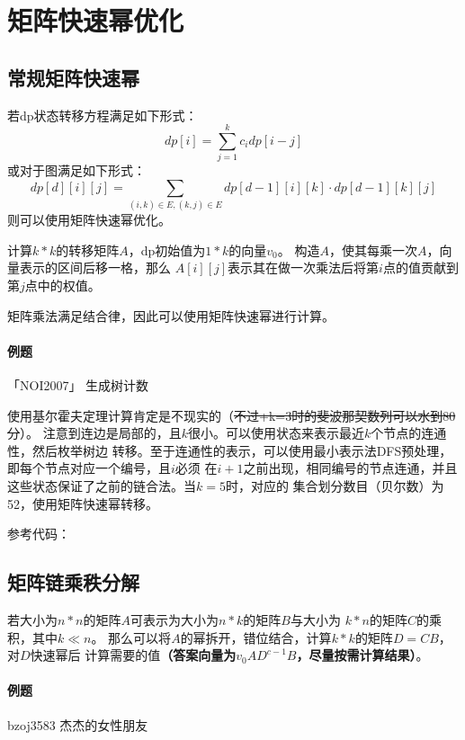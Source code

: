 \section{矩阵快速幂优化}
\subsection{常规矩阵快速幂}
若dp状态转移方程满足如下形式：
\begin{displaymath}
    dp[i]=\sum_{j=1}^k{c_idp[i-j]}
\end{displaymath}
或对于图满足如下形式：
\begin{displaymath}
    dp[d][i][j]=\sum_{(i,k)\in E,(k,j)\in E}{dp[d-1][i][k]\cdot dp[d-1][k][j]}
\end{displaymath}
则可以使用矩阵快速幂优化。

计算$k*k$的转移矩阵$A$，dp初始值为$1*k$的向量$v_0$。
构造$A$，使其每乘一次$A$，向量表示的区间后移一格，那么
$A[i][j]$表示其在做一次乘法后将第$i$点的值贡献到第$j$点中的权值。

矩阵乘法满足结合律，因此可以使用矩阵快速幂进行计算。

\paragraph{例题} 「NOI2007」 生成树计数

使用基尔霍夫定理计算肯定是不现实的（\sout{不过+k=3时的斐波那契数列可以水到80分}）。
注意到连边是局部的，且$k$很小。可以使用状态来表示最近$k$个节点的连通性，然后枚举树边
转移。至于连通性的表示，可以使用最小表示法DFS预处理，即每个节点对应一个编号，且$i$必须
在$i+1$之前出现，相同编号的节点连通，并且这些状态保证了之前的链合法。当$k=5$时，对应的
集合划分数目（贝尔数）为52，使用矩阵快速幂转移。

参考代码：


\subsection{矩阵链乘秩分解}

若大小为$n*n$的矩阵$A$可表示为大小为$n*k$的矩阵$B$与大小为
$k*n$的矩阵$C$的乘积，其中$k\ll n$。
那么可以将$A$的幂拆开，错位结合，计算$k*k$的矩阵$D=CB$，对$D$快速幂后
计算需要的值{\bfseries （答案向量为$v_0AD^{c-1}B$，尽量按需计算结果）}。

\paragraph{例题} bzoj3583 杰杰的女性朋友


